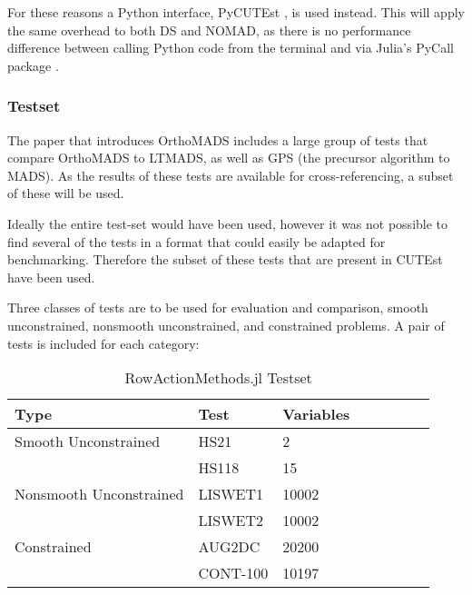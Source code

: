 For these reasons a Python interface, PyCUTEst \cite{PyCUTEst}, is used instead. This will apply the same overhead to both DS and NOMAD, as there is no performance difference between calling Python code from the terminal and via Julia's PyCall package \cite{JuliaPyCall}.

\subsubsection{Testset}

The paper that introduces OrthoMADS \cite{Abramson2009Orthomads:Ions} includes a large group of tests that compare OrthoMADS to LTMADS, as well as GPS (the precursor algorithm to MADS). As the results of these tests are available for cross-referencing, a subset of these will be used.

Ideally the entire test-set would have been used, however it was not possible to find several of the tests in a format that could easily be adapted for benchmarking. Therefore the subset of these tests that are present in CUTEst have been used. 

Three classes of tests are to be used for evaluation and comparison, smooth unconstrained, nonsmooth unconstrained, and constrained problems. A pair of tests is included for each category:


\begin{table}[h] 
\centering
\begin{tabular}{llllllll} \toprule
    {Type} & {Test}      & {Variables} &   \\ \midrule
    Smooth Unconstrained & {HS21}      & 2 & \\
    & {HS118}     & 15 & \\ \midrule
    Nonsmooth Unconstrained & {LISWET1}   & 10002 & \\  
    & {LISWET2}   & 10002 & \\ \midrule
    Constrained & {AUG2DC}    & 20200 & \\ 
    & {CONT-100}  & 10197 & \\ \bottomrule
\end{tabular}
    \caption{\label{table:ram_tests} RowActionMethods.jl Testset}
\end{table}